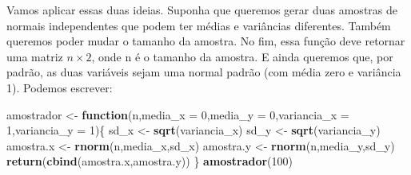\documentclass[]{book}
\newenvironment{Shaded}{\begin{snugshade}}{\end{snugshade}}
\newcommand{\KeywordTok}[1]{\textcolor[rgb]{0.13,0.29,0.53}{\textbf{#1}}}
\newcommand{\DataTypeTok}[1]{\textcolor[rgb]{0.13,0.29,0.53}{#1}}
\newcommand{\DecValTok}[1]{\textcolor[rgb]{0.00,0.00,0.81}{#1}}
\newcommand{\StringTok}[1]{\textcolor[rgb]{0.31,0.60,0.02}{#1}}
\newcommand{\ControlFlowTok}[1]{\textcolor[rgb]{0.13,0.29,0.53}{\textbf{#1}}}
\newcommand{\NormalTok}[1]{#1}
\begin{document}
Vamos aplicar essas duas ideias. Suponha que queremos gerar duas
amostras de normais independentes que podem ter médias e variâncias
diferentes. Também queremos poder mudar o tamanho da amostra. No fim,
essa função deve retornar uma matriz \(n \times 2\), onde n é o tamanho
da amostra. E ainda queremos que, por padrão, as duas variáveis sejam
uma normal padrão (com média zero e variância 1). Podemos escrever:

\begin{Shaded}
\begin{Highlighting}[]
\NormalTok{amostrador <-}\StringTok{ }\ControlFlowTok{function}\NormalTok{(n,}\DataTypeTok{media_x =} \DecValTok{0}\NormalTok{,}\DataTypeTok{media_y =} \DecValTok{0}\NormalTok{,}\DataTypeTok{variancia_x =} \DecValTok{1}\NormalTok{,}\DataTypeTok{variancia_y =} \DecValTok{1}\NormalTok{)\{}
\NormalTok{sd_x <-}\StringTok{ }\KeywordTok{sqrt}\NormalTok{(variancia_x)}
\NormalTok{sd_y <-}\StringTok{ }\KeywordTok{sqrt}\NormalTok{(variancia_y)}
\NormalTok{amostra.x <-}\StringTok{ }\KeywordTok{rnorm}\NormalTok{(n,media_x,sd_x)}
\NormalTok{amostra.y <-}\StringTok{ }\KeywordTok{rnorm}\NormalTok{(n,media_y,sd_y)}
\KeywordTok{return}\NormalTok{(}\KeywordTok{cbind}\NormalTok{(amostra.x,amostra.y))}
\NormalTok{\}}
\KeywordTok{amostrador}\NormalTok{(}\DecValTok{100}\NormalTok{)}
\end{Highlighting}
\end{Shaded}
\end{document}
